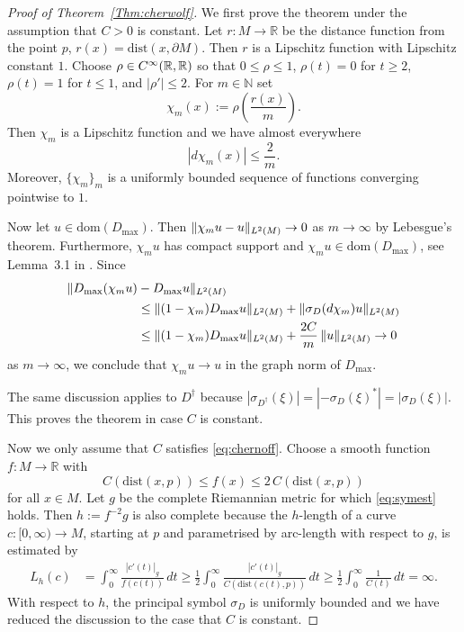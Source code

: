 \documentclass[a4paper,10pt,reqno]{amsart}
\newcommand{\R}{\mathbb{R}}
\newcommand{\N}{\mathbb{N}}
\newcommand{\Lp}[2][{}]{{\rm L}^{#2}_{\rm #1}}%
\newcommand{\Ck}[2][{}]{{\rm C}^{#2}_{\rm #1}}%
\newcommand{\dom}{\mathrm{dom}}
\newcommand{\dM}{\partial M}
\theoremstyle{definition}
\begin{document}
\begin{proof}[Proof of Theorem~\ref{Thm:cherwolf}]
We first prove the theorem under the assumption that $C>0$ is constant.
Let $r:M\to\R$ be the distance function from the point $p$, $r(x)=\mathrm{dist}(x,\dM)$.
Then $r$ is a Lipschitz function with Lipschitz constant $1$.
Choose $\rho\in\Ck{\infty}(\R,\R)$ so that $0\le\rho\le 1$, $\rho(t)=0$ for $t\ge2$,
$\rho(t)=1$ for $t\le1$, and $|\rho'|\le 2$.
For $m\in\N$ set
\[
\chi_m(x) := \rho\left(\frac{r(x)}{m}\right).
\]
Then $\chi_m$ is a Lipschitz function and we have almost everywhere
\[
|d\chi_m(x)| \le \frac{2}{m} .
\]
Moreover, $\{\chi_m\}_m$ is a uniformly bounded sequence of functions converging pointwise to $1$.

Now let $ u\in\dom(D_{\max})$.
Then $\| \chi_m u -  u \|_{\Lp{2}(M)} \to 0$ as $m\to\infty$ by Lebesgue's theorem.
Furthermore, $\chi_m u$ has compact support and $\chi_m u\in\dom(D_{\max})$, see Lemma~3.1 in \cite{BB12}.
Since
\begin{align*}
\| D_{\max}(\chi_m u) & - D_{\max} u \|_{\Lp{2}(M)}                                                       \\
                      & \le \| (1-\chi_m)D_{\max} u\|_{\Lp{2}(M)} + \| \sigma_D(d\chi_m) u \|_{\Lp{2}(M)} \\
                      & \le \| (1-\chi_m)D_{\max} u\|_{\Lp{2}(M)} + \frac{2C}{m}\,\|  u \|_{\Lp{2}(M)}
\to 0
\end{align*}
as $m\to\infty$, we conclude that $\chi_m u \to  u$ in the graph norm of $D_{\max}$.

The same discussion applies to $D^\dagger$ because $|\sigma_{D^\dagger}(\xi)|=|-\sigma_{D}(\xi)^*|=|\sigma_{D}(\xi)|$.
This proves the theorem in case $C$ is constant.

Now we only assume that $C$ satisfies \eqref{eq:chernoff}.
Choose a smooth function $f:M\to\R$ with
\[
C(\mathrm{dist}(x,p)) \leq f(x) \le 2\, C(\mathrm{dist}(x,p))
\]
for all $x\in M$.
Let $g$ be the complete Riemannian metric for which \eqref{eq:symest} holds.
Then $h:=f^{-2}g$ is also complete because the $h$-length of a curve $c:[0,\infty)\to M$, starting at $p$ and parametrised by arc-length with respect to $g$, is estimated by
\begin{align*}
L_h(c)
 & =
\int_0^\infty \frac{|c'(t)|_g}{f(c(t))}\, dt
\ge
\frac12 \int_0^\infty \frac{|c'(t)|_g}{C(\mathrm{dist}(c(t),p))}\, dt
\ge
\frac12 \int_0^\infty \frac{1}{C(t)}\, dt
=
\infty .
\end{align*}
With respect to $h$, the principal symbol $\sigma_D$ is uniformly bounded and we have reduced the discussion to the case that $C$ is constant.
\end{proof}
\end{document}
